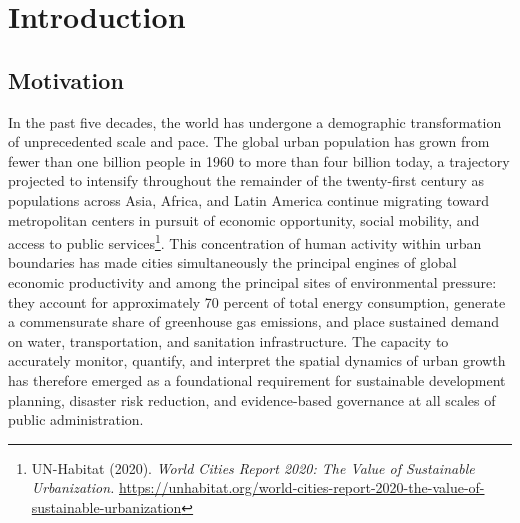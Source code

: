 \chapter{Introduction}

\section{Motivation}

In the past five decades, the world has undergone a demographic transformation of unprecedented scale and pace. The global urban population has grown from fewer than one billion people in 1960 to more than four billion today, a trajectory projected to intensify throughout the remainder of the twenty-first century as populations across Asia, Africa, and Latin America continue migrating toward metropolitan centers in pursuit of economic opportunity, social mobility, and access to public services\footnote{\label{fn:UNH} UN-Habitat (2020). \textit{World Cities Report 2020: The Value of Sustainable Urbanization.} \url{https://unhabitat.org/world-cities-report-2020-the-value-of-sustainable-urbanization}}. This concentration of human activity within urban boundaries has made cities simultaneously the principal engines of global economic productivity and among the principal sites of environmental pressure: they account for approximately 70 percent of total energy consumption, generate a commensurate share of greenhouse gas emissions, and place sustained demand on water, transportation, and sanitation infrastructure. The capacity to accurately monitor, quantify, and interpret the spatial dynamics of urban growth has therefore emerged as a foundational requirement for sustainable development planning, disaster risk reduction, and evidence-based governance at all scales of public administration.

